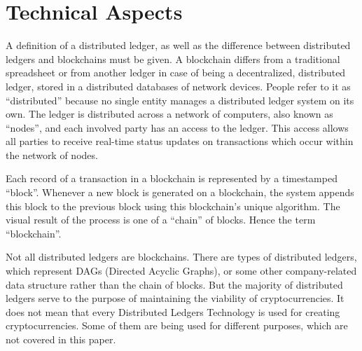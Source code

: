 \documentclass[12pt]{article}
\begin{document}
\section{Technical Aspects}\label{sec:ta}
A definition of a distributed ledger, as well as the difference between
distributed ledgers and blockchains must be given. A blockchain differs from a
traditional spreadsheet or from another ledger in case of being a
decentralized, distributed ledger, stored in a distributed databases of network
devices. People refer to it as ``distributed'' because no single entity manages
a distributed ledger system on its own. The ledger is distributed across a
network of computers, also known as ``nodes'', and each involved party has an
access to the ledger. This access allows all parties to receive real-time
status updates on transactions which occur within the network of nodes.

Each record of a transaction in a blockchain is represented by a timestamped
``block''. Whenever a new block is generated on a blockchain, the system
appends this block to the previous block using this blockchain’s unique
algorithm. The visual result of the process is one of a ``chain'' of blocks.
Hence the term ``blockchain''.

Not all distributed ledgers are blockchains. There are types of distributed
ledgers, which represent DAGs (Directed Acyclic Graphs), or some other
company-related data structure rather than the chain of blocks. But the
majority of distributed ledgers serve to the purpose of maintaining the
viability of cryptocurrencies. It does not mean that every Distributed Ledgers
Technology is used for creating cryptocurrencies. Some of them are being used
for different purposes, which are not covered in this paper.
\end{document}
